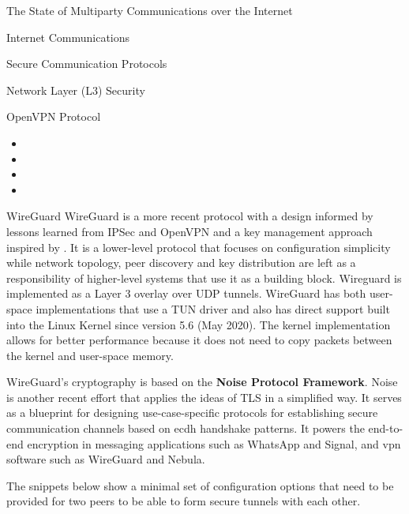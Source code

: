 \begin{frame}[fragile]{The State of Multiparty Communications over the
Internet}
\begin{block}{Internet Communications}
\begin{block}{Secure Communication Protocols}
\begin{block}{Network Layer (L3) Security}
\begin{block}{OpenVPN Protocol}
\protect\hypertarget{openvpn-protocol}{}
\begin{itemize}
\tightlist
\item
\item
\item
\item
\end{itemize}
\end{block}

\begin{block}{WireGuard}
\protect\hypertarget{wireguard}{}
WireGuard \autocite{donenfeldWireGuardNextGeneration2017} is a more
recent protocol with a design informed by lessons learned from IPSec and
OpenVPN and a key management approach inspired by . It is a
lower-level protocol that focuses on configuration simplicity while
network topology, peer discovery and key distribution are left as a
responsibility of higher-level systems that use it as a building block.
Wireguard is implemented as a Layer 3 overlay over UDP tunnels.
WireGuard has both user-space implementations that use a TUN driver and
also has direct support built into the Linux Kernel since version 5.6
(May 2020). The kernel implementation allows for better performance
because it does not need to copy packets between the kernel and
user-space memory.

WireGuard's cryptography is based on the \textbf{Noise Protocol
Framework}\autocite{noiseDocs}. Noise is another recent effort that
applies the ideas of TLS in a simplified way. It serves as a blueprint
for designing use-case-specific protocols for establishing secure
communication channels based on \gls{ecdh} handshake patterns. It powers
the end-to-end encryption in messaging applications such as WhatsApp and
Signal, and \gls{vpn} software such as WireGuard and Nebula.
 

The snippets below show a minimal set of configuration options that need
to be provided for two peers to be able to form secure tunnels with each
other.

\begin{Shaded}
\begin{Highlighting}[]
\KeywordTok{[Interface]}
\OtherTok{=}
\OtherTok{=}\StringTok{ }
\OtherTok{=}


\end{Highlighting}
\end{Shaded}
\end{block}
\end{block}
\end{block}
\end{block}
\end{frame}
